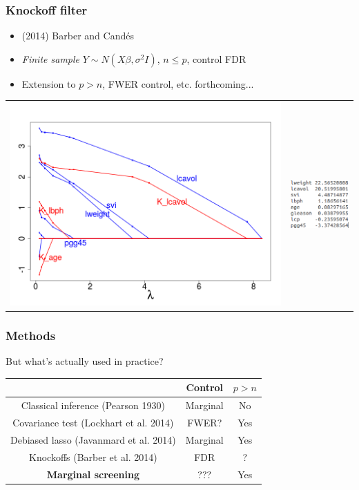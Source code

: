 \documentclass{beamer}
\begin{document}
\begin{frame}
\frametitle{Knockoff filter}
\begin{itemize}
\item (2014) Barber and Cand\'{e}s
\item \emph{Finite sample} $Y \sim N(X\beta, \sigma^2 I)$, $n \leq p$, control FDR
\item Extension to $p > n$, FWER control, etc. forthcoming...
\end{itemize}
\begin{center}
\begin{tabular}{cc}
\includegraphics[scale = 0.25]{knockoff.png} &
\includegraphics[scale = 0.5, trim=0in -1in 0.5in 0in, clip]{knockoff2.png}
\end{tabular}
\end{center}
\end{frame}


\begin{frame}
\frametitle{Methods}
But what's actually used in practice?
\begin{center}
\begin{tabular}{|c|c|c|} \hline
 & Control & $p > n$\\ \hline
Classical inference (Pearson 1930) & Marginal & No \\ \hline
Covariance test (Lockhart et al. 2014) &  FWER? & Yes \\ \hline
Debiased lasso (Javanmard et al. 2014) & Marginal & Yes\\ \hline
Knockoffs (Barber et al. 2014) & FDR & ? \\ \hline
\textbf{Marginal screening} & ??? & Yes \\ \hline
\end{tabular}
\end{center}
\end{frame}
\end{document}
